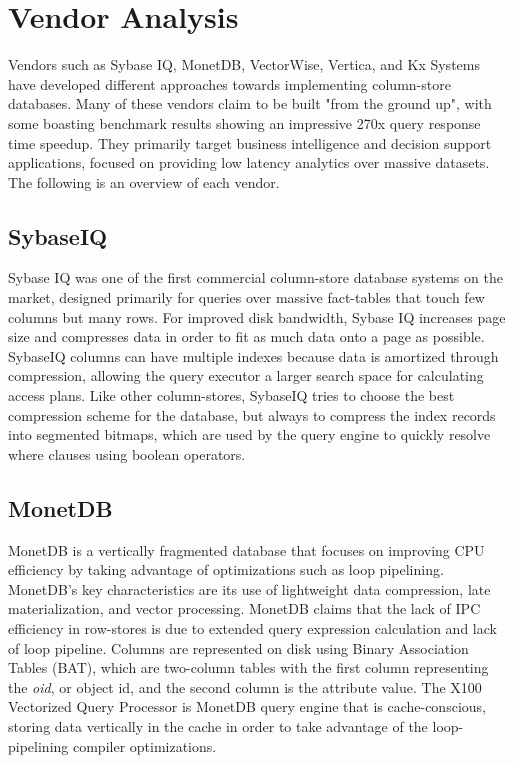 \documentclass[11pt,a4paper]{report}
\begin{document}
\section{Vendor Analysis}
Vendors such as Sybase IQ, MonetDB, VectorWise, Vertica, and Kx Systems have developed different approaches towards implementing column-store databases. Many of these vendors claim to be built "from the ground up", with some boasting benchmark results showing an impressive 270x query response time speedup.\cite{boncz2005monetdb, verticawp} They primarily target business intelligence and decision support applications, focused on providing low latency analytics over massive datasets.\cite{boncz2005monetdb, verticawp, kxwp, vwwp} The following is an overview of each vendor.

\subsection{SybaseIQ}
Sybase IQ was one of the first commercial column-store database systems on the market, designed primarily for queries over massive fact-tables that touch few columns but many rows.\cite{macnicol2004sybase} For improved disk bandwidth, Sybase IQ increases page size and compresses data in order to fit as much data onto a page as possible.\cite{macnicol2004sybase} SybaseIQ columns can have multiple indexes because data is amortized through compression, allowing the query executor a larger search space for calculating access plans. Like other column-stores, SybaseIQ tries to choose the best compression scheme for the database, but always to compress the index records into segmented bitmaps, which are used by the query engine to quickly resolve where clauses using boolean operators.\cite{macnicol2004sybase}

\subsection{MonetDB}
MonetDB is a vertically fragmented database that focuses on improving CPU efficiency by taking advantage of optimizations such as loop pipelining.\cite{boncz2005monetdb}  MonetDB's key characteristics are its use of lightweight data compression, late materialization, and vector processing.\cite{boncz2005monetdb, vldbtut} MonetDB claims that the lack of IPC efficiency in row-stores is due to extended query expression calculation and lack of loop pipeline.\cite{boncz2005monetdb} Columns are represented on disk using Binary Association Tables (BAT), which are two-column tables with the first column representing the \textit{oid}, or object id, and the second column is the attribute value. The X100 Vectorized Query Processor is MonetDB query engine that is cache-conscious, storing data vertically in the cache in order to take advantage of the loop-pipelining compiler optimizations.\cite{boncz2005monetdb}
\end{document}

